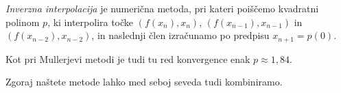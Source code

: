 \begin{definicija}
\emph{Inverzna interpolacija}
je numerična metoda, pri kateri poiščemo kvadratni polinom $p$, ki
interpolira točke $(f(x_n), x_n)$, $(f(x_{n-1}), x_{n-1})$ in
$(f(x_{n-2}), x_{n-2})$, in naslednji člen izračunamo po predpisu
$x_{n+1} = p(0)$.
\end{definicija}

\begin{opomba}
Kot pri Mullerjevi metodi je tudi tu red konvergence enak
$p \approx 1{,}84$.
\end{opomba}

\begin{opomba}
Zgoraj naštete metode lahko med seboj seveda tudi kombiniramo.
\end{opomba}
